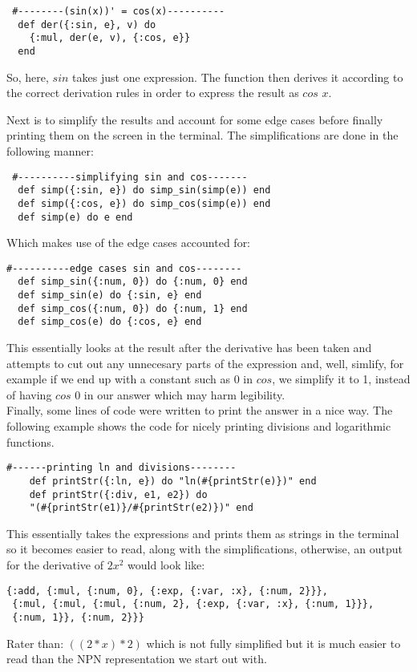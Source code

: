 \documentclass[a4paper,11pt]{article}
\begin{document}
\begin{verbatim}
 #--------(sin(x))' = cos(x)----------
  def der({:sin, e}, v) do
    {:mul, der(e, v), {:cos, e}}
  end
 \end{verbatim}
 So, here, $sin$ takes just one expression. The function then derives it according to the correct derivation rules in order to express the result as $cos$ $x$.
 
 Next is to simplify the results and account for some edge cases before finally printing them on the screen in the terminal. The simplifications are done in the following manner:
 \begin{verbatim}
 #----------simplifying sin and cos-------
  def simp({:sin, e}) do simp_sin(simp(e)) end
  def simp({:cos, e}) do simp_cos(simp(e)) end
  def simp(e) do e end
\end{verbatim}

Which makes use of the edge cases accounted for:

\begin{verbatim}
#----------edge cases sin and cos--------
  def simp_sin({:num, 0}) do {:num, 0} end
  def simp_sin(e) do {:sin, e} end
  def simp_cos({:num, 0}) do {:num, 1} end
  def simp_cos(e) do {:cos, e} end
\end{verbatim}

This essentially looks at the result after the derivative has been taken and attempts to cut out any unnecesary parts of the expression and, well, simlify, for example if we end up with a constant such as 0 in $cos$, we simplify it to 1, instead of having $cos$ 0 in our answer which may harm legibility. \\

Finally, some lines of code were written to print the answer in a nice way. The following example shows the code for nicely printing divisions and logarithmic functions.

\begin{verbatim}
#------printing ln and divisions--------
    def printStr({:ln, e}) do "ln(#{printStr(e)})" end
    def printStr({:div, e1, e2}) do 
    "(#{printStr(e1)}/#{printStr(e2)})" end
\end{verbatim} 

This essentially takes the expressions and prints them as strings in the terminal so it becomes easier to read, along with the simplifications, otherwise, an output for the derivative of $2x^2$ would look like:
\begin{verbatim}
{:add, {:mul, {:num, 0}, {:exp, {:var, :x}, {:num, 2}}},
 {:mul, {:mul, {:mul, {:num, 2}, {:exp, {:var, :x}, {:num, 1}}}, 
 {:num, 1}}, {:num, 2}}}
\end{verbatim}
 
 Rater than: $((2 * x) * 2)$ which is not fully simplified but it is much easier to read than the NPN representation we start out with.
\end{document}

